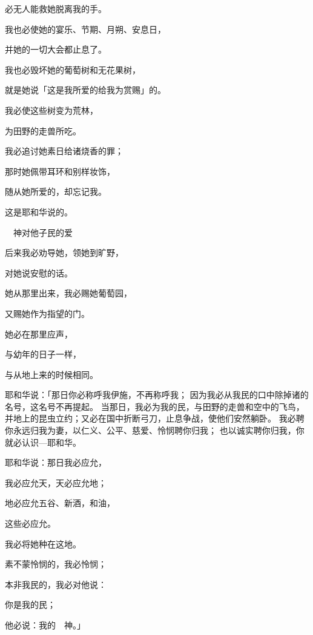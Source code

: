 {\par }{\Q 必无人能救她脱离我的手。
\par }{\Q {}我也必使她的宴乐、节期、月朔、安息日，
\par }{\Q 并她的一切大会都止息了。
\par }{\Q {}我也必毁坏她的葡萄树和无花果树，
\par }{\Q 就是她说「这是我所爱的给我为赏赐」的。
\par }{\Q 我必使这些树变为荒林，
\par }{\Q 为田野的走兽所吃。
\par }{\Q {}我必追讨她素日给诸{}烧香的罪；
\par }{\Q 那时她佩带耳环和别样妆饰，
\par }{\Q 随从她所爱的，却忘记我。
\par }{\Q 这是耶和华说的。
\par }{\SH 　神对他子民的爱
\par }{\Q {}后来我必劝导她，领她到旷野，
\par }{\Q 对她说安慰的话。
\par }{\Q {}她从那里出来，我必赐她葡萄园，
\par }{\Q 又赐她{}作为指望的门。
\par }{\Q 她必在那里应声，
\par }{\Q 与幼年的日子一样，
\par }{\Q 与从{}地上来的时候相同。
\par }{\PP {}耶和华说：「那日你必称呼我伊施，不再称呼我{}；
因为我必从我民的口中除掉诸{}的名号，这名号不再提起。
当那日，我必为我的民，与田野的走兽和空中的飞鸟，并地上的昆虫立约；又必在国中折断弓刀，止息争战，使他们安然躺卧。
我必聘你永远归我为妻，以仁义、公平、慈爱、怜悯聘你归我；
也以诚实聘你归我，你就必认识{}—耶和华。
\par }{\Q {}耶和华说：那日我必应允，
\par }{\Q 我必应允天，天必应允地；
\par }{\Q {}地必应允五谷、新酒，和油，
\par }{\Q 这些必应允{}{}。
\par }{\Q {}我必将她种在这地。
\par }{\Q 素不蒙怜悯的，我必怜悯；
\par }{\Q 本非我民的，我必对他说：
\par }{\Q 你是我的民；
\par }{\Q 他必说：{}我的　神。」

}
